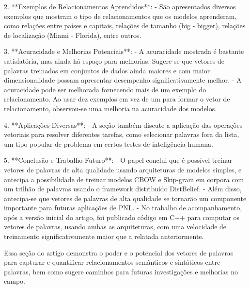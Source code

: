 2. **Exemplos de Relacionamentos Aprendidos**:
   - São apresentados diversos exemplos que mostram o tipo de relacionamentos que os modelos aprenderam, como relações entre países e capitais, relações de tamanho (big - bigger), relações de localização (Miami - Florida), entre outros.

3. **Acuracidade e Melhorias Potenciais**:
   - A acuracidade mostrada é bastante satisfatória, mas ainda há espaço para melhorias. Sugere-se que vetores de palavras treinados em conjuntos de dados ainda maiores e com maior dimensionalidade possam apresentar desempenho significativamente melhor.
   - A acuracidade pode ser melhorada fornecendo mais de um exemplo do relacionamento. Ao usar dez exemplos em vez de um para formar o vetor de relacionamento, observou-se uma melhoria na acuracidade dos modelos.

4. **Aplicações Diversas**:
   - A seção também discute a aplicação das operações vetoriais para resolver diferentes tarefas, como selecionar palavras fora da lista, um tipo popular de problema em certos testes de inteligência humana.

5. **Conclusão e Trabalho Futuro**:
   - O papel conclui que é possível treinar vetores de palavras de alta qualidade usando arquiteturas de modelos simples, e antecipa a possibilidade de treinar modelos CBOW e Skip-gram em corpora com um trilhão de palavras usando o framework distribuído DistBelief.
   - Além disso, antecipa-se que vetores de palavras de alta qualidade se tornarão um componente importante para futuras aplicações de PNL.
   - No trabalho de acompanhamento, após a versão inicial do artigo, foi publicado código em C++ para computar os vetores de palavras, usando ambas as arquiteturas, com uma velocidade de treinamento significativamente maior que a relatada anteriormente.

Essa seção do artigo demonstra o poder e o potencial dos vetores de palavras para capturar e quantificar relacionamentos semânticos e sintáticos entre palavras, bem como sugere caminhos para futuras investigações e melhorias no campo. 
